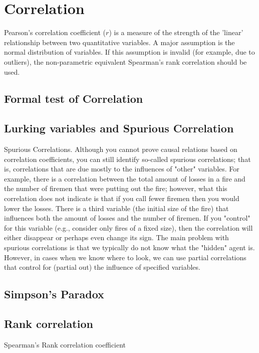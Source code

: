


\section{Correlation}

Pearson's correlation coefficient ($r$) is a measure of the strength of the 'linear' relationship between two quantitative variables. A major assumption is the normal distribution of variables. If this assumption is invalid (for example, due to outliers), the non-parametric equivalent Spearman's rank correlation should be used.

\subsection{Formal test of Correlation}
\subsection{Lurking variables and Spurious Correlation}
Spurious Correlations. Although you cannot prove causal relations based on correlation coefficients, you can still identify so-called spurious correlations; that is, correlations that are due mostly to the influences of "other" variables. For example, there is a correlation between the total amount of losses in a fire and the number of firemen that were putting out the fire; however, what this correlation does not indicate is that if you call fewer firemen then you would lower the losses. There is a third variable (the initial size of the fire) that influences both the amount of losses and the number of firemen. If you "control" for this variable (e.g., consider only fires of a fixed size), then the correlation will either disappear or perhaps even change its sign. The main problem with spurious correlations is that we typically do not know what the "hidden" agent is. However, in cases when we know where to look, we can use partial correlations that control for (partial out) the influence of specified variables.



\subsection{Simpson's Paradox}
\subsection{Rank correlation}
Spearman's Rank correlation coefficient


